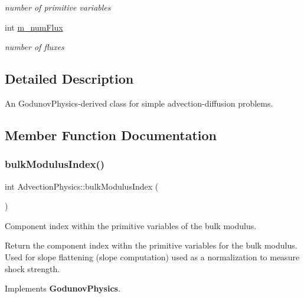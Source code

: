 \begin{DoxyCompactItemize}
\begin{DoxyCompactList}\small\item\em number of primitive variables \end{DoxyCompactList}\item 
\mbox{\label{class_advection_physics_a4b511a54b271cfb434500fbf9ce3fc88}} 
int \hyperlink{class_advection_physics_a4b511a54b271cfb434500fbf9ce3fc88}{m\+\_\+num\+Flux}
\begin{DoxyCompactList}\small\item\em number of fluxes \end{DoxyCompactList}\end{DoxyCompactItemize}


\subsection{Detailed Description}
An Godunov\+Physics-\/derived class for simple advection-\/diffusion problems. 

\subsection{Member Function Documentation}
\mbox{\label{class_advection_physics_a2d6f7e55296e5701bb52eeea7610b1e5}} 
\subsubsection{\texorpdfstring{bulk\+Modulus\+Index()}{bulkModulusIndex()}}
{\footnotesize\ttfamily int Advection\+Physics\+::bulk\+Modulus\+Index (\begin{DoxyParamCaption}{ }\end{DoxyParamCaption})\hspace{0.3cm}{\ttfamily [virtual]}}



Component index within the primitive variables of the bulk modulus. 

Return the component index withn the primitive variables for the bulk modulus. Used for slope flattening (slope computation) used as a normalization to measure shock strength. 

Implements \textbf{ Godunov\+Physics}.

